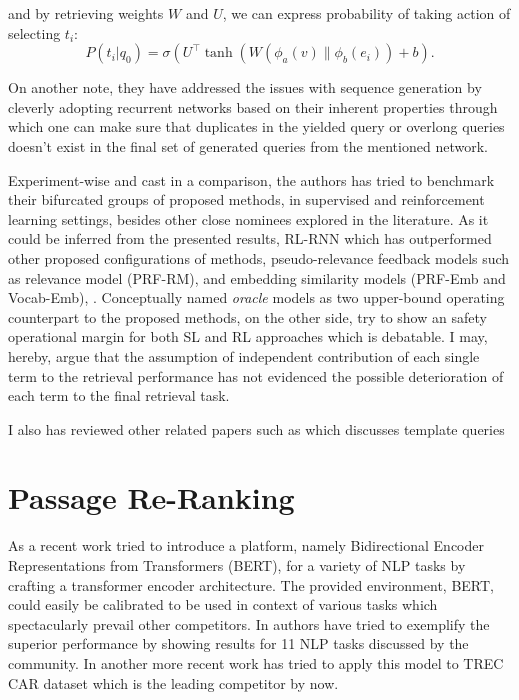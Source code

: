 \documentclass[letterpaper,12pt]{article}
\begin{document}
and by retrieving weights $W$ and $U$, we can express probability of taking action of selecting $t_i$: 
\begin{equation}
    P \left( t _ { i } | q _ { 0 } \right) = \sigma \left( U ^ { \top } \tanh \left( W \left( \phi _ { a } ( v ) \| \phi _ { b } \left( e _ { i } \right) \right) + b \right)\right..
\end{equation}

On another note, they have addressed the issues with sequence generation by cleverly adopting recurrent networks based on their inherent properties through which one can make sure that duplicates in the yielded query or overlong queries doesn't exist in the final set of generated queries from the mentioned network.

Experiment-wise and cast in a comparison, the authors has tried to benchmark their bifurcated groups of proposed methods, in supervised and reinforcement learning settings, besides other close nominees explored in the literature. As it could be inferred from the presented results, RL-RNN which has outperformed other proposed configurations of methods, pseudo-relevance feedback models such as  relevance model (PRF-RM)\cite{Lavrenko2001}, and embedding similarity models (PRF-Emb and Vocab-Emb)\cite{Roy2016}, \cite{Kuzi}. Conceptually named \textit{oracle} models as two upper-bound operating counterpart to the proposed methods, on the other side, try to show an safety operational margin for both SL and RL approaches which is debatable. I may, hereby, argue that the assumption of independent contribution of each single term to the retrieval performance has not evidenced the possible deterioration of each term to the final retrieval task.

I also has reviewed other related papers such as \cite{Narasimhan2016} which discusses template queries  

\section{Passage Re-Ranking}
As a recent work \cite{Devlin2018} tried to introduce a platform, namely Bidirectional Encoder Representations from
Transformers (BERT), for a variety of NLP tasks by crafting a transformer encoder architecture. The provided environment, BERT, could easily be calibrated to be used in context of various tasks which spectacularly prevail other competitors. In \cite{Devlin2018} authors have tried to exemplify the superior performance by showing results for 11 NLP tasks discussed by the community. In another more recent work \cite{Nogueira2019} has tried to apply this model to TREC CAR \cite{Dietz} dataset which is the leading competitor by now.
\end{document}
